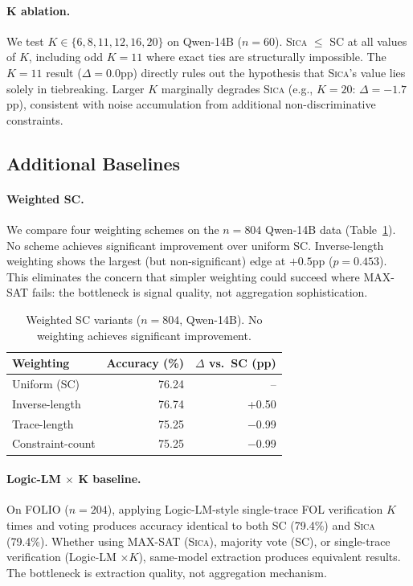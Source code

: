\documentclass[11pt,a4paper]{article}
\newcommand{\sica}{\textsc{Sica}}
\begin{document}
\paragraph{K ablation.}
We test $K \in \{6, 8, 11, 12, 16, 20\}$ on Qwen-14B ($n=60$).
\sica{} $\leq$ SC at all values of $K$, including odd $K=11$ where exact ties are structurally impossible.
The $K=11$ result ($\Delta = 0.0$pp) directly rules out the hypothesis that \sica{}'s value lies solely in tiebreaking.
Larger $K$ marginally degrades \sica{} (e.g., $K=20$: $\Delta = -1.7$pp), consistent with noise accumulation from additional non-discriminative constraints.

\subsection{Additional Baselines}
\label{sec:baselines}

\paragraph{Weighted SC.}
We compare four weighting schemes on the $n=804$ Qwen-14B data (Table~\ref{tab:weighted_sc}).
No scheme achieves significant improvement over uniform SC.
Inverse-length weighting shows the largest (but non-significant) edge at $+0.5$pp ($p=0.453$).
This eliminates the concern that simpler weighting could succeed where MAX-SAT fails: the bottleneck is signal quality, not aggregation sophistication.

\begin{table}[t]
\centering
\caption{Weighted SC variants ($n=804$, Qwen-14B). No weighting achieves significant improvement.}
\label{tab:weighted_sc}
\small
\begin{tabular}{lrr}
\toprule
\textbf{Weighting} & \textbf{Accuracy (\%)} & \textbf{$\Delta$ vs.\ SC (pp)} \\
\midrule
Uniform (SC) & 76.24 & -- \\
Inverse-length & 76.74 & +0.50 \\
Trace-length & 75.25 & $-$0.99 \\
Constraint-count & 75.25 & $-$0.99 \\
\bottomrule
\end{tabular}
\end{table}

\paragraph{Logic-LM $\times$ K baseline.}
On FOLIO ($n=204$), applying Logic-LM-style single-trace FOL verification $K$ times and voting produces accuracy identical to both SC (79.4\%) and \sica{} (79.4\%).
Whether using MAX-SAT (\sica{}), majority vote (SC), or single-trace verification (Logic-LM $\times K$), same-model extraction produces equivalent results.
The bottleneck is extraction quality, not aggregation mechanism.
\end{document}
